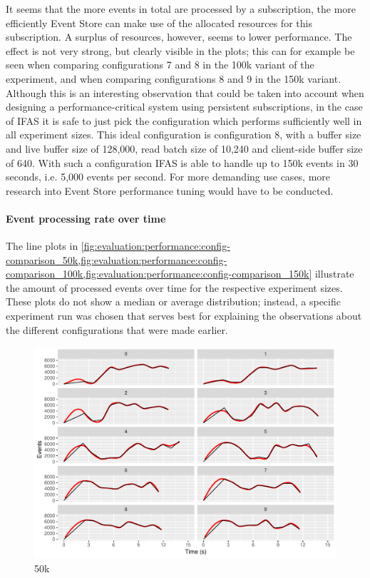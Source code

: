 It seems that the more events in total are processed by a subscription, the more efficiently Event Store can make use of the allocated resources for this subscription.
A surplus of resources, however, seems to lower performance.
The effect is not very strong, but clearly visible in the plots; this can for example be seen when comparing configurations 7 and 8 in the 100k variant of the experiment, and when comparing configurations 8 and 9 in the 150k variant.
Although this is an interesting observation that could be taken into account when designing a performance-critical system using persistent subscriptions, in the case of \ac{IFAS} it is safe to just pick the configuration which performs sufficiently well in all experiment sizes.
This ideal configuration is configuration 8, with a buffer size and live buffer size of 128,000, read batch size of 10,240 and client-side buffer size of 640.
With such a configuration \ac{IFAS} is able to handle up to 150k events in 30 seconds, i.e. 5,000 events per second.
For more demanding use cases, more research into Event Store performance tuning would have to be conducted.

\paragraph{Event processing rate over time}

The line plots in \cref{fig:evaluation:performance:config-comparison_50k,fig:evaluation:performance:config-comparison_100k,fig:evaluation:performance:config-comparison_150k} illustrate the amount of processed events over time for the respective experiment sizes.
These plots do not show a median or average distribution; instead, a specific experiment run was chosen that serves best for explaining the observations about the different configurations that were made earlier.

\begin{figure}[htb]
        \includegraphics[width=\textwidth]{gfx/config-comparison_50k.pdf}
        \caption{50k}
        \label{fig:evaluation:performance:config-comparison_50k}
\end{figure}

